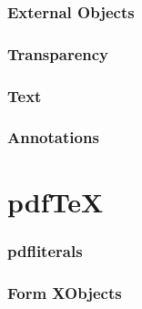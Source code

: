 

\section{External Objects}



\section{Transparency}



\section{Text}



\section{Annotations}



\part{pdf\TeX}



\section{pdfliterals}



\section{Form XObjects}



\bye

